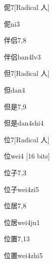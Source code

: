 \begin{entry}{伲}{7}[Radical 人]
  \begin{phonetics}{伲}{ni3}
  \end{phonetics}
\end{entry}

\begin{entry}{伴侣}{7,8}
  \begin{phonetics}{伴侣}{ban4lv3}
  \end{phonetics}
\end{entry}

\begin{entry}{但}{7}[Radical 人]
  \begin{phonetics}{但}{dan4}
  \end{phonetics}
\end{entry}

\begin{entry}{但是}{7,9}
  \begin{phonetics}{但是}{dan4shi4}
  \end{phonetics}
\end{entry}

\begin{entry}{位}{7}[Radical 人]
  \begin{phonetics}{位}{wei4}
    [16 bits]
  \end{phonetics}
\end{entry}

\begin{entry}{位子}{7,3}
  \begin{phonetics}{位子}{wei4zi5}
  \end{phonetics}
\end{entry}

\begin{entry}{位居}{7,8}
  \begin{phonetics}{位居}{wei4ju1}
  \end{phonetics}
\end{entry}

\begin{entry}{位置}{7,13}
  \begin{phonetics}{位置}{wei4zhi5}
  \end{phonetics}
\end{entry}

